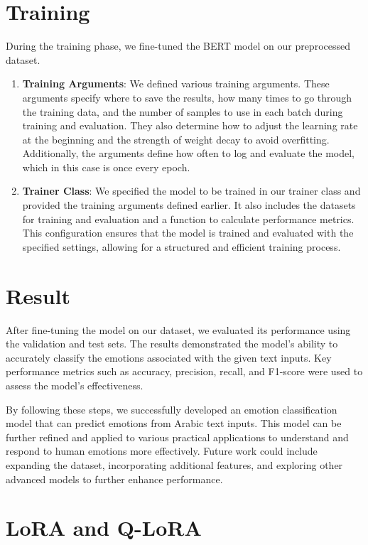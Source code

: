 \section{Training}
During the training phase, we fine-tuned the BERT model on our preprocessed dataset.
\begin{enumerate}
    \item \textbf{Training Arguments}: We defined various training arguments. These arguments specify where to save the results, how many times to go through the training data, and the number of samples to use in each batch during training and evaluation. They also determine how to adjust the learning rate at the beginning and the strength of weight decay to avoid overfitting. Additionally, the arguments define how often to log and evaluate the model, which in this case is once every epoch.
    \item \textbf{Trainer Class}: We specified the model to be trained in our trainer class and provided the training arguments defined earlier. It also includes the datasets for training and evaluation and a function to calculate performance metrics. This configuration ensures that the model is trained and evaluated with the specified settings, allowing for a structured and efficient training process.
\end{enumerate}

\section{Result}
After fine-tuning the model on our dataset, we evaluated its performance using the validation and test sets. The results demonstrated the model's ability to accurately classify the emotions associated with the given text inputs. Key performance metrics such as accuracy, precision, recall, and F1-score were used to assess the model's effectiveness.

By following these steps, we successfully developed an emotion classification model that can predict emotions from Arabic text inputs. This model can be further refined and applied to various practical applications to understand and respond to human emotions more effectively. Future work could include expanding the dataset, incorporating additional features, and exploring other advanced models to further enhance performance.

\section{LoRA and Q-LoRA}

